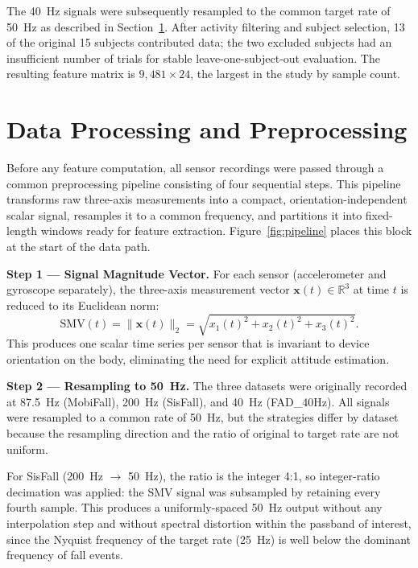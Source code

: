 \documentclass[onluarkali,ingilizce,yukseklisans,karton,LisansustuEgitim]{itutez}
\providecommand{\R}{\mathbb{R}}
\providecommand{\1}{\mathbf{1}}
\begin{document}
The 40~Hz signals were subsequently resampled to the common target rate of 50~Hz as described in Section~\ref{subsec:preprocessing}. After activity filtering and subject selection, 13 of the original 15 subjects contributed data; the two excluded subjects had an insufficient number of trials for stable leave-one-subject-out evaluation. The resulting feature matrix is $9{,}481 \times 24$, the largest in the study by sample count.

\section{Data Processing and Preprocessing}
\label{subsec:preprocessing}

Before any feature computation, all sensor recordings were passed through a common preprocessing pipeline consisting of four sequential steps. This pipeline transforms raw three-axis measurements into a compact, orientation-independent scalar signal, resamples it to a common frequency, and partitions it into fixed-length windows ready for feature extraction. Figure~\ref{fig:pipeline} places this block at the start of the data path.

\textbf{Step 1 --- Signal Magnitude Vector.}
For each sensor (accelerometer and gyroscope separately), the three-axis measurement vector $\mathbf{x}(t) \in \R^3$ at time $t$ is reduced to its Euclidean norm:
\[
  \mathrm{SMV}(t) = \bigl\|\mathbf{x}(t)\bigr\|_2 = \sqrt{x_1(t)^2 + x_2(t)^2 + x_3(t)^2}.
\]
This produces one scalar time series per sensor that is invariant to device orientation on the body, eliminating the need for explicit attitude estimation.

\textbf{Step 2 --- Resampling to 50~Hz.}
The three datasets were originally recorded at 87.5~Hz (MobiFall), 200~Hz (SisFall), and 40~Hz (FAD\_40Hz). All signals were resampled to a common rate of 50~Hz, but the strategies differ by dataset because the resampling direction and the ratio of original to target rate are not uniform.

For SisFall (200~Hz $\to$ 50~Hz), the ratio is the integer 4:1, so integer-ratio decimation was applied: the SMV signal was subsampled by retaining every fourth sample. This produces a uniformly-spaced 50~Hz output without any interpolation step and without spectral distortion within the passband of interest, since the Nyquist frequency of the target rate (25~Hz) is well below the dominant frequency of fall events.
\end{document}
